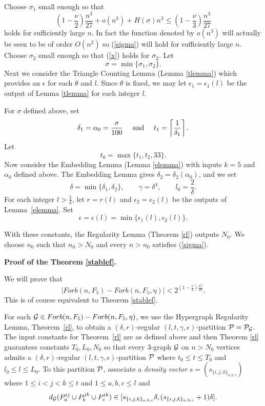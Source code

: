 \documentclass[11pt]{article}
\begin{document}
Choose $\sigma_1$ small enough  so that
\begin{equation} \label{sigma}
\left(1-\frac{\nu}{2}\right)\frac{n^3}{27}+o(n^3)+H(\sigma)n^3\le \left(1-\frac{\nu}{3}\right)\frac{n^3}{27}\end{equation}
holds for sufficiently large $n$.  In fact the function denoted by
$o(n^3)$  will actually be seen to be of order $O(n^2)$ so
(\ref{sigma}) will hold for sufficiently large $n$. Choose $\sigma_2$ small enough so that (\ref{x}) holds for $\sigma_2$. Let
$$\sigma=\min\{\sigma_1, \sigma_2\}.$$
Next we consider the Triangle Counting Lemma (Lemma \ref{tlemma}) which provides an
$\epsilon$ for each  $\theta$ and $l$. Since $\theta$ is fixed, we may let
$\epsilon_1=\epsilon_1(l)$ be the output of Lemma \ref{tlemma} for each integer $l$.

For $\sigma$ defined above, set
\begin{equation} \label{alpha}\delta_1=\alpha_0=\frac{\sigma}{100} \quad
\hbox{ and } \quad t_1=\left\lceil \frac{1}{\delta_1} \right\rceil.\end{equation}
Let
$$t_0=\max\{t_1, t_2, 33\}.$$
Now consider the Embedding Lemma (Lemma \ref{elemma}) with inputs $k=5$ and $\alpha_0$
defined above.  The Embedding Lemma gives $\delta_2=\delta_2(\alpha_0)$, and
we set
\begin{equation} \label{delta} \delta=\min\{\delta_1, \delta_2\}, \quad
\quad \gamma=\delta^4, \quad \quad l_0=\frac{2}{\delta}.\end{equation}
For each integer $l>\frac{1}{\delta}$, let $r=r(l)$ and
$\epsilon_2=\epsilon_2(l)$ be the outputs of Lemma~\ref{elemma}. Set
\begin{equation} \label{epsilonl}\epsilon=\epsilon(l)=\min\{\epsilon_1(l), \epsilon_2(l)\}.\end{equation}

With these constants, the Regularity Lemma (Theorem \ref{rl}) outputs $N_0$.  We choose
$n_0$ such that $n_0>N_0$  and every $n>n_0$ satisfies
(\ref{sigma}).


\medskip


{\bf Proof of the Theorem \ref{stablef}.}

We will prove that $$|Forb(n,F_5)-Forb(n, F_5, \eta)|<2^{(1-\frac{
\nu}{3})\frac{n^3}{27}}.$$ This is of course equivalent to Theorem
\ref{stablef}.

For each ${{\cal G}} \in Forb(n,F_5)-Forb(n, F_5, \eta)$, we use the
Hypergraph Regularity Lemma, Theorem~\ref{rl}, to obtain a $(\delta,
r)$-regular $(l, t, \gamma, \epsilon)$-partition ${\cal P}={\cal P}_{{{\cal G}}}$.
The input constants for Theorem~\ref{rl} are as defined above and
then Theorem \ref{rl} guarantees constants $T_0, L_0, N_0$ so that
every $3$-graph ${{\cal G}}$ on $n>N_0$ vertices admits a $(\delta,
r)$-regular $(l, t, \gamma, \epsilon)$-partition ${\cal P}$ where $t_0
\le t \le T_0$ and $l_0\le l \le L_0$. To this partition ${\cal P}$,
associate a {\em density vector} $s=(s_{\{i,j,k\}_{a,b,c}})$ where $1
\le i<j<k\le t$ and $1\le a,b,c \le l$ and
$$d_{{{\cal G}}}(P_a^{ij} \cup P_b^{jk} \cup P_c^{ik})\in [s_{\{i,j,k\}_{a,b,c}}\delta, (s_{\{i,j,k\}_{a,b,c}}+1)\delta].$$
\end{document}
